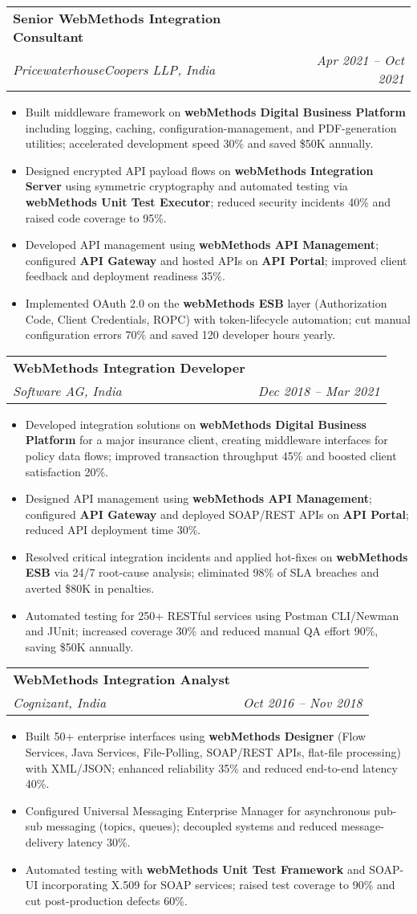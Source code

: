 \documentclass[letterpaper,11pt]{article}
\makeatletter
\newcommand{\resumeItem}[1]{
  \item\small{
    {#1 \vspace{-1pt}}
  }
}
\newcommand{\resumeSubheading}[4]{
  \vspace{-2pt}\item
    \begin{tabular*}{1.0\textwidth}[t]{l@{\extracolsep{\fill}}r}
      \textbf{\large#1} & \textbf{\small #2} \\
      \textit{\large#3} & \textit{\small #4} \\
      
    \end{tabular*}\vspace{-7pt}
}
\newcommand{\resumeItemListStart}{\begin{itemize}[leftmargin=0.1in]}
\newcommand{\resumeItemListEnd}{\end{itemize}\vspace{-5pt}}
\makeatother
\begin{document}
    \resumeSubheading
      {Senior WebMethods Integration Consultant}{}
      {PricewaterhouseCoopers LLP, India}{Apr 2021 -- Oct 2021}
      \resumeItemListStart
        \resumeItem{\normalsize{Built middleware framework on \textbf{webMethods Digital Business Platform} including logging, caching, configuration-management, and PDF-generation utilities; accelerated development speed 30\% and saved \$50K annually.}}
        \resumeItem{\normalsize{Designed encrypted API payload flows on \textbf{webMethods Integration Server} using symmetric cryptography and automated testing via \textbf{webMethods Unit Test Executor}; reduced security incidents 40\% and raised code coverage to 95\%.}}
        \resumeItem{\normalsize{Developed API management using \textbf{webMethods API Management}; configured \textbf{API Gateway} and hosted APIs on \textbf{API Portal}; improved client feedback and deployment readiness 35\%.}}
        \resumeItem{\normalsize{Implemented OAuth 2.0 on the \textbf{webMethods ESB} layer (Authorization Code, Client Credentials, ROPC) with token-lifecycle automation; cut manual configuration errors 70\% and saved 120 developer hours yearly.}}
      \resumeItemListEnd

    \resumeSubheading
      {WebMethods Integration Developer}{}
      {Software AG, India}{Dec 2018 -- Mar 2021}
      \resumeItemListStart
        \resumeItem{\normalsize{Developed integration solutions on \textbf{webMethods Digital Business Platform} for a major insurance client, creating middleware interfaces for policy data flows; improved transaction throughput 45\% and boosted client satisfaction 20\%.}}
        \resumeItem{\normalsize{Designed API management using \textbf{webMethods API Management}; configured \textbf{API Gateway} and deployed SOAP/REST APIs on \textbf{API Portal}; reduced API deployment time 30\%.}}
        \resumeItem{\normalsize{Resolved critical integration incidents and applied hot-fixes on \textbf{webMethods ESB} via 24/7 root-cause analysis; eliminated 98\% of SLA breaches and averted \$80K in penalties.}}
        \resumeItem{\normalsize{Automated testing for 250+ RESTful services using Postman CLI/Newman and JUnit; increased coverage 30\% and reduced manual QA effort 90\%, saving \$50K annually.}}
      \resumeItemListEnd

    \resumeSubheading
      {WebMethods Integration Analyst}{}
      {Cognizant, India}{Oct 2016 -- Nov 2018}
      \resumeItemListStart
        \resumeItem{\normalsize{Built 50+ enterprise interfaces using \textbf{webMethods Designer} (Flow Services, Java Services, File-Polling, SOAP/REST APIs, flat-file processing) with XML/JSON; enhanced reliability 35\% and reduced end-to-end latency 40\%.}}
        \resumeItem{\normalsize{Configured Universal Messaging Enterprise Manager for asynchronous pub-sub messaging (topics, queues); decoupled systems and reduced message-delivery latency 30\%.}}
        \resumeItem{\normalsize{Automated testing with \textbf{webMethods Unit Test Framework} and SOAP-UI incorporating X.509 for SOAP services; raised test coverage to 90\% and cut post-production defects 60\%.}}
      \resumeItemListEnd
\end{document}
